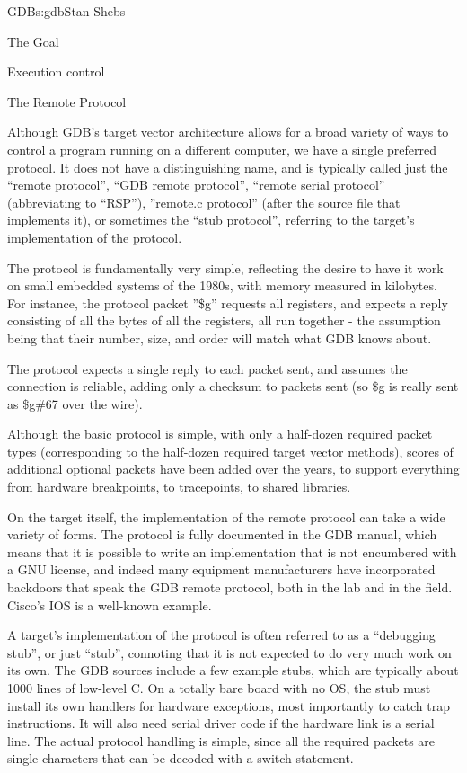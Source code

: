 \begin{aosachapter}{GDB}{s:gdb}{Stan Shebs}
\begin{aosasect1}{The Goal}
\begin{aosasect1}{Execution control}

\end{aosasect1}

\begin{aosasect1}{The Remote Protocol}

Although GDB's target vector architecture allows for a broad variety
of ways to control a program running on a different computer, we have
a single preferred protocol.  It does not have a distinguishing name,
and is typically called just the ``remote protocol'', ``GDB remote
protocol'', ``remote serial protocol'' (abbreviating to ``RSP''),
''remote.c protocol'' (after the source file that implements it), or
sometimes the ``stub protocol'', referring to the target's
implementation of the protocol.

The protocol is fundamentally very simple, reflecting the desire to
have it work on small embedded systems of the 1980s, with memory
measured in kilobytes.  For instance, the protocol packet ''\$g''
requests all registers, and expects a reply consisting of all the
bytes of all the registers, all run together - the assumption being
that their number, size, and order will match what GDB knows about.

The protocol expects a single reply to each packet sent, and assumes
the connection is reliable, adding only a checksum to packets sent
(so \$g is really sent as \$g\#67 over the wire).

Although the basic protocol is simple, with only a half-dozen required
packet types (corresponding to the half-dozen required target vector
methods), scores of additional optional packets have been added over the
years, to support everything from hardware breakpoints, to tracepoints, to
shared libraries.

On the target itself, the implementation of the remote protocol can
take a wide variety of forms.  The protocol is fully documented in the
GDB manual, which means that it is possible to write an implementation
that is not encumbered with a GNU license, and indeed many equipment
manufacturers have incorporated backdoors that speak the GDB remote
protocol, both in the lab and in the field.  Cisco's IOS is a well-known
example.

A target's implementation of the protocol is often referred to as a
``debugging stub'', or just ``stub'', connoting that it is not expected
to do very much work on its own.  The GDB sources include a few
example stubs, which are typically about 1000 lines of low-level C.
On a totally bare board with no OS, the stub must install its own
handlers for hardware exceptions, most importantly to catch trap
instructions.  It will also need serial driver code if the hardware
link is a serial line.  The actual protocol handling is simple, since
all the required packets are single characters that can be decoded
with a switch statement.


\end{aosasect1}
\end{aosasect1}
\end{aosachapter}
